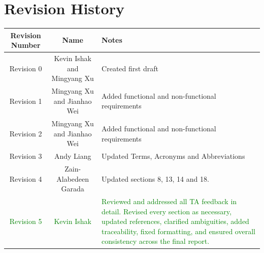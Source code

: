 \documentclass[12pt]{article}
\newcommand{\added}[1]{\textcolor{green}{#1}}
\begin{document}
\section{Revision History}
\begin{tabularx}{\textwidth}{|c|c|X|}
\hline
\textbf{Revision Number} & \textbf{Name} & \textbf{Notes} \\
\hline
Revision 0 & Kevin Ishak and Mingyang Xu & Created first draft \\
Revision 1 & Mingyang Xu and Jianhao Wei & Added functional and non-functional requirements \\
Revision 2 & Mingyang Xu and Jianhao Wei & Added functional and non-functional requirements \\
Revision 3 & Andy Liang & Updated Terms, Acronyms and Abbreviations \\
Revision 4 & Zain-Alabedeen Garada & Updated sections 8, 13, 14 and 18. \\
\added{Revision 5} & \added{Kevin Ishak} & \added{Reviewed and addressed all TA feedback in detail. Revised every section as necessary, updated references, clarified ambiguities, added traceability, fixed formatting, and ensured overall consistency across the final report.} \\
\hline
\end{tabularx}
\end{document}
